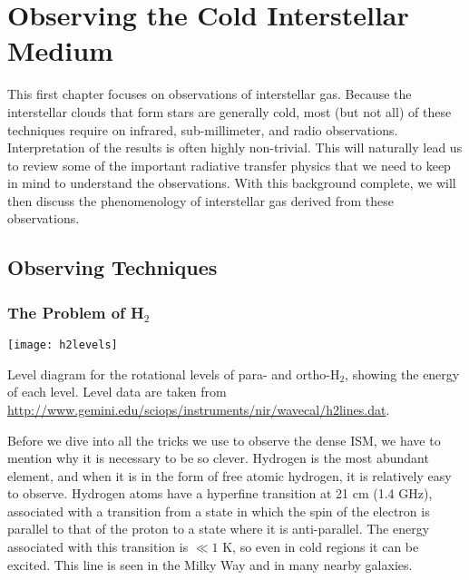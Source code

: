 \chapter{Observing the Cold Interstellar Medium}
\label{ch:obscold}


This first chapter focuses on observations of interstellar gas. Because the interstellar clouds that form stars are generally cold, most (but not all) of these techniques require on infrared, sub-millimeter, and radio observations. Interpretation of the results is often highly non-trivial. This will naturally lead us to review some of the important radiative transfer physics that we need to keep in mind to understand the observations. With this background complete, we will then discuss the phenomenology of interstellar gas derived from these observations.

\section{Observing Techniques}

\subsection{The Problem of H$_2$}

\begin{marginfigure}
\texttt{[image: h2levels]}
\caption[H$_2$ level diagram]{
\label{fig:h2levels}
Level diagram for the rotational levels of para- and ortho-H$_2$, showing the energy of each level. Level data are taken from \url{http://www.gemini.edu/sciops/instruments/nir/wavecal/h2lines.dat}.
}
\end{marginfigure}

Before we dive into all the tricks we use to observe the dense ISM, we have to mention why it is necessary to be so clever. Hydrogen is the most abundant element, and when it is in the form of free atomic hydrogen, it is relatively easy to observe.
Hydrogen atoms have a hyperfine transition at 21 cm (1.4 GHz), associated with a transition from a state in which the spin of the electron is parallel to that of the proton to a state where it is anti-parallel. The energy associated with this transition is $\ll 1$ K, so even in cold regions it can be excited. This line is seen in the Milky Way and in many nearby galaxies.
  
